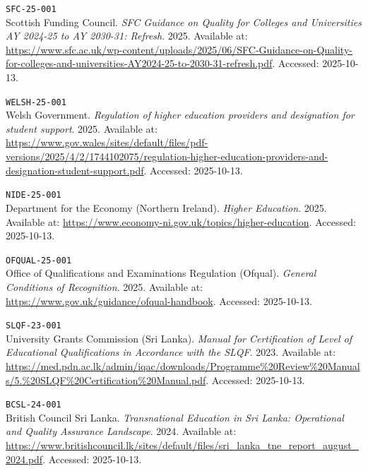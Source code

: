 \texttt{SFC-25-001} \\
Scottish Funding Council. \textit{SFC Guidance on Quality for Colleges and Universities AY 2024-25
to AY 2030-31: Refresh}. 2025. Available at:
\url{https://www.sfc.ac.uk/wp-content/uploads/2025/06/SFC-Guidance-on-Quality-for-colleges-and-universities-AY2024-25-to-2030-31-refresh.pdf}. 
Accessed: 2025-10-13.

\texttt{WELSH-25-001} \\
Welsh Government. \textit{Regulation of higher education providers and designation for student
support}. 2025. Available at:
\url{https://www.gov.wales/sites/default/files/pdf-versions/2025/4/2/1744102075/regulation-higher-education-providers-and-designation-student-support.pdf}. 
Accessed: 2025-10-13.

\texttt{NIDE-25-001} \\
Department for the Economy (Northern Ireland). \textit{Higher Education}. 2025. Available at:
\url{https://www.economy-ni.gov.uk/topics/higher-education}. 
Accessed: 2025-10-13.

\texttt{OFQUAL-25-001} \\
Office of Qualifications and Examinations Regulation (Ofqual). \textit{General Conditions of
Recognition}. 2025. Available at:
\url{https://www.gov.uk/guidance/ofqual-handbook}. 
Accessed: 2025-10-13.

\texttt{SLQF-23-001} \\
University Grants Commission (Sri Lanka). \textit{Manual for Certification of Level of
Educational Qualifications in Accordance with the SLQF}. 2023. Available at:
\url{https://med.pdn.ac.lk/admin/iqac/downloads/Programme%20Review%20Manuals/5.%20SLQF%20Certification%20Manual.pdf}. 
Accessed: 2025-10-13.

\texttt{BCSL-24-001} \\
British Council Sri Lanka. \textit{Transnational Education in Sri Lanka: Operational and Quality
Assurance Landscape}. 2024. Available at:
\url{https://www.britishcouncil.lk/sites/default/files/sri_lanka_tne_report_august_2024.pdf}. 
Accessed: 2025-10-13.

\endgroup
